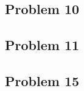 \documentclass{ctexart}
\begin{document}
  \subsection{Problem 10}
  
  \subsection{Problem 11}
  
  \subsection{Problem 15}
  
\end{document}
